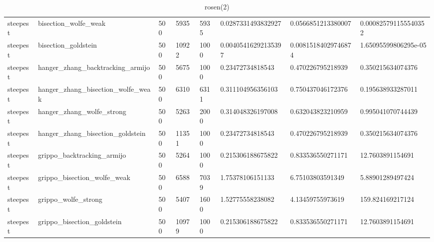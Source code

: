 \documentclass[a4paper,11pt]{article}
\numberwithin{equation}{section} %
\begin{document}
\begin{table}[h!]
{\begin{tabular}{|l|l|l|l|l|l|l|l|}
        steepest & bisection\_wolfe\_weak & 500 & 5935 & 5935 & 0.0287331493832927 & 0.0566851213380007 & 0.000825791155540352 \\
        steepest & bisection\_goldstein & 500 & 10922 & 1000 & 0.00405416292135397 & 0.00815184029746874 & 1.65095599806295e-05 \\
        steepest & hanger\_zhang\_backtracking\_armijo & 500 & 5675 & 1000 & 0.23472734818543 & 0.470226795218939 & 0.350215634074376 \\
        steepest & hanger\_zhang\_bisection\_wolfe\_weak & 500 & 6310 & 6311 & 0.311104956356103 & 0.750437046172376 & 0.195638933287011 \\
        steepest & hanger\_zhang\_wolfe\_strong & 500 & 5263 & 2000 & 0.314048326197008 & 0.632043823210959 & 0.995041070744439 \\
        steepest & hanger\_zhang\_bisection\_goldstein & 500 & 11351 & 1000 & 0.23472734818543 & 0.470226795218939 & 0.350215634074376 \\
        steepest & grippo\_backtracking\_armijo & 500 & 5264 & 1000 & 0.215306188675822 & 0.833536550271171 & 12.7603891154691 \\
        steepest & grippo\_bisection\_wolfe\_weak & 500 & 6588 & 7039 & 1.75378106151133 & 6.75103803591349 & 5.88901289497424 \\
        steepest & grippo\_wolfe\_strong & 500 & 5407 & 1600 & 1.52775558238082 & 4.13459755973619 & 159.824169217124 \\
        steepest & grippo\_bisection\_goldstein & 500 & 10979 & 1000 & 0.215306188675822 & 0.833536550271171 & 12.7603891154691 \\
\end{tabular}}
\caption{rosen(2)}
\label{table:rosen(2)}
\end{table}
\end{document}
